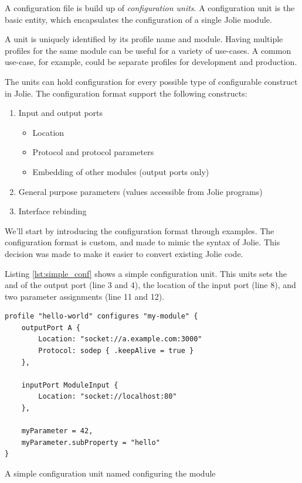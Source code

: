 
A configuration file is build up of \emph{configuration units}.  A
configuration unit is the basic entity, which encapsulates the configuration of
a single Jolie module.

A unit is uniquely identified by its profile name and module. Having multiple
profiles for the same module can be useful for a variety of use-cases. A common
use-case, for example, could be separate profiles for development and
production.

The units can hold configuration for every possible type of configurable
construct in Jolie. The configuration format support the following constructs:

\begin{enumerate}
    \item Input and output ports
        \begin{itemize}
            \item Location
            \item Protocol and protocol parameters
            \item Embedding of other modules (output ports only)
        \end{itemize}
    \item General purpose parameters (values accessible from
            Jolie programs)
    \item Interface rebinding
\end{enumerate}

We'll start by introducing the configuration format through examples.  The
configuration format is custom, and made to mimic the syntax of Jolie. This
decision was made to make it easier to convert existing Jolie code.

Listing \ref{lst:simple_conf} shows a simple configuration unit. This units
sets the  and  of the output port 
(line 3 and 4), the location of the input port  (line 8),
    and two parameter assignments (line 11 and 12).

\begin{listing}[H]
\begin{verbatim}
profile "hello-world" configures "my-module" {
    outputPort A {
        Location: "socket://a.example.com:3000"
        Protocol: sodep { .keepAlive = true }
    },

    inputPort ModuleInput {
        Location: "socket://localhost:80"
    },

    myParameter = 42,
    myParameter.subProperty = "hello"
}
\end{verbatim}

\caption{A simple configuration unit named 
    configuring the module }

\label{lst:simple_conf}

\end{listing}


